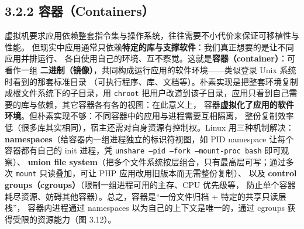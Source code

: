 \begin{closeread}
\end{closeread}


\subsection*{3.2.2 容器（Containers）}
虚拟机要求应用依赖整套指令集与操作系统，往往需要不小代价来保证可移植性与性能。
但现实中应用通常只依赖\textbf{特定的库与支撑软件}：我们真正想要的是让不同应用并排运行、
各自使用自己的环境、互不察觉。这就是\textbf{容器（container）}：可看作一组
\textbf{二进制（镜像）}，共同构成运行应用的软件环境——类似登录 Unix 系统时看到的那套标准目录
（可执行程序、库、文档等）。朴素实现是把整套环境复制成根文件系统下的子目录，用 \texttt{chroot}
把用户改道到该子目录，应用只看到自己需要的库与依赖，其它容器各有各的视图：在此意义上，
容器\textbf{虚拟化了应用的软件环境}。但朴素实现不够：不同容器中的应用与进程需要互相隔离，
整份复制效率低（很多库其实相同），宿主还需对自身资源有控制权。Linux 用三种机制解决：
\textbf{namespaces}（给容器内一组进程独立的标识符视图，如 PID namespace 让每个容器都有自己的
init 进程，凭 \texttt{unshare --pid --fork --mount-proc bash} 即可观察）、
\textbf{union file system}（把多个文件系统按层组合，只有最高层可写；通过多次
\texttt{mount} 只读叠加，可让 PHP 应用改用旧版本而无需整份复制）、
以及 \textbf{control groups（cgroups）}（限制一组进程可用的主存、CPU 优先级等，
防止单个容器耗尽资源、妨碍其他容器）。总之，容器是“一份文件归档 + 特定的共享只读层栈”，
容器内进程通过 namespaces 以为自己的上下文是唯一的，通过 cgroups 获得受限的资源能力（图 3.12）。

